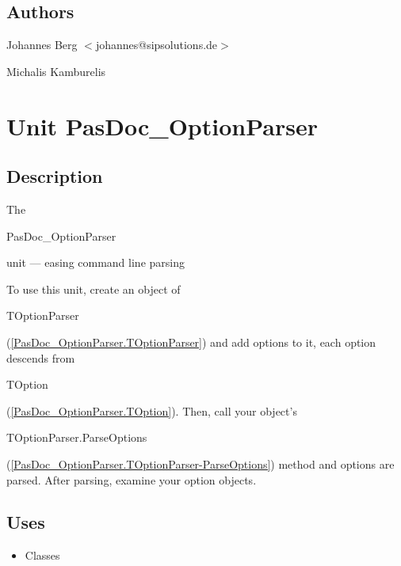 \documentclass{report}
\begin{document}
\section{Authors}
\par
Johannes Berg {$<$}johannes@sipsolutions.de{$>$}

\par
Michalis Kamburelis

\chapter{Unit PasDoc{\_}OptionParser}
\label{PasDoc_OptionParser}
\section{Description}
The \begin{ttfamily}PasDoc{\_}OptionParser\end{ttfamily} unit --- easing command line parsing\hfill\vspace*{1ex}

 

To use this unit, create an object of \begin{ttfamily}TOptionParser\end{ttfamily}(\ref{PasDoc_OptionParser.TOptionParser}) and add options to it, each option descends from \begin{ttfamily}TOption\end{ttfamily}(\ref{PasDoc_OptionParser.TOption}). Then, call your object's \begin{ttfamily}TOptionParser.ParseOptions\end{ttfamily}(\ref{PasDoc_OptionParser.TOptionParser-ParseOptions}) method and options are parsed. After parsing, examine your option objects.
\section{Uses}
\begin{itemize}
\item \begin{ttfamily}Classes\end{ttfamily}\end{itemize}
\end{document}
